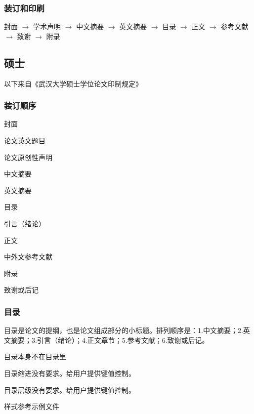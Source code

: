 \subsubsection{装订和印刷}

\begin{reference}
  封面 $\to$ 学术声明 $\to$ 中文摘要 $\to$ 英文摘要 $\to$ 目录 $\to$ 正文 $\to$ 参考文献 $\to$ 致谢 $\to$ 附录
\end{reference}



\subsection{硕士}

以下来自《武汉大学硕士学位论文印制规定》

\subsubsection{装订顺序}

\begin{choices}[label = \arabic*.]
  \item 封面
  \item 论文英文题目
  \item 论文原创性声明
  \item 中文摘要
  \item 英文摘要
  \item 目录
  \item 引言（绪论）
  \item 正文
  \item 中外文参考文献
  \item 附录
  \item 致谢或后记
\end{choices}


\subsubsection{目录}

\begin{reference}
  目录是论文的提纲，也是论文组成部分的小标题。排列顺序是：1.中文摘要；2.英文摘要；3.引言（绪论）；4.正文章节；5.参考文献；6.致谢或后记。
\end{reference}

\begin{points}
  \item 目录本身不在目录里
  \item 目录缩进没有要求。给用户提供键值控制。
  \item 目录层级没有要求。给用户提供键值控制。
  \item 样式参考示例文件
\end{points}



